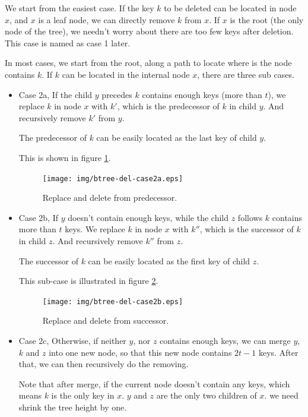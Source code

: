 \documentclass[b5paper]{article}
\begin{document}
We start from the easiest case. If the key $k$ to be deleted
can be located in node $x$, and $x$ is a leaf node,
we can directly remove $k$ from $x$. If $x$ is the root (the only
node of the tree), we needn't worry about there are too few
keys after deletion. This case is named as case 1 later.

In most cases, we start from the root, along a path to locate
where is the node contains $k$. If $k$ can be located in the
internal node $x$, there are three sub cases.

\begin{itemize}
\item Case 2a, If the child $y$ precedes $k$ contains enough keys (more than $t$),
we replace $k$ in node $x$ with $k'$, which is
the predecessor of $k$ in child $y$. And recursively remove $k'$
from $y$.

The predecessor of $k$ can be easily located as the last key of child
$y$.

This is shown in figure \ref{fig:btree-del-case2a}.

\begin{figure}[htbp]
  \centering
    \texttt{[image: img/btree-del-case2a.eps]}
    \caption{Replace and delete from predecessor.} \label{fig:btree-del-case2a}
\end{figure}

\item Case 2b, If $y$ doesn't contain enough keys, while the child $z$
follows $k$ contains more than $t$ keys. We replace $k$ in node $x$
with $k''$, which is the successor of $k$ in child $z$. And recursively
remove $k''$ from $z$.

The successor of $k$ can be easily located as the first key of child $z$.

This sub-case is illustrated in figure \ref{fig:btree-del-case2b}.

\begin{figure}[htbp]
  \centering
    \texttt{[image: img/btree-del-case2b.eps]}
    \caption{Replace and delete from successor.} \label{fig:btree-del-case2b}
\end{figure}

\item Case 2c, Otherwise, if neither $y$, nor $z$ contains enough keys, we
can merge $y$, $k$ and $z$ into one new node, so that this new node
contains $2t-1$ keys. After that, we can then recursively do the removing.

Note that after merge, if the current node doesn't contain any keys,
which means $k$ is the only key in $x$. $y$ and $z$ are the only two
children of $x$. we need shrink the tree height by one.
\end{itemize}
\end{document}

